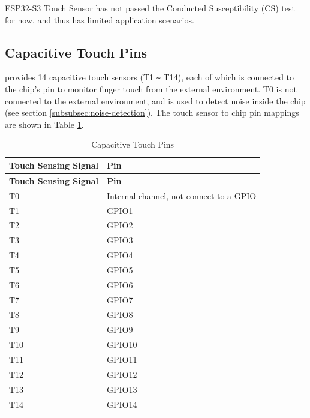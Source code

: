 \documentclass[main\_\_EN.tex]{subfiles}
\begin{document}
\begin{tiplisting}
ESP32-S3 Touch Sensor has not passed the Conducted Susceptibility (CS) test for now, and thus has limited application scenarios. 
\end{tiplisting}
\vspace{-1em}

\subsection{Capacitive Touch Pins}

\chipname{} provides 14 capacitive touch sensors (T1 \verb+~+ T14), each of which is connected to the chip's pin to monitor finger touch from the external environment. T0 is not connected to the external environment, and is used to detect noise inside the chip (see section \ref{subsubsec:noise-detection}). The touch sensor to chip pin mappings are shown in Table \ref{table:touch pads}.
\begin{longtable}[c]{|p{4.0cm}|p{6.0cm}| }
    \caption{\chipname{} Capacitive Touch Pins}
    \label{table:touch pads}
    \\\hline
    \rowcolor{lightgray}
    \textbf{Touch Sensing Signal} & \textbf{Pin} \\
    \hline
    \endfirsthead
    \hline
    \rowcolor{lightgray}
    \textbf{Touch Sensing Signal} & \textbf{Pin} \\
    \hline
    \endhead
    \endfoot
    \endlastfoot
    T0  & Internal channel, not connect to a GPIO \\\hline
    T1  &  GPIO1 \\\hline
    T2  &  GPIO2 \\\hline
    T3  &  GPIO3  \\\hline
    T4  &  GPIO4  \\\hline
    T5  &  GPIO5  \\\hline
    T6  &  GPIO6  \\\hline
    T7  &  GPIO7 \\\hline
    T8  &  GPIO8 \\\hline
    T9  &  GPIO9 \\\hline
    T10 &  GPIO10 \\\hline
    T11 &  GPIO11 \\\hline
    T12 &  GPIO12 \\\hline
    T13 &  GPIO13 \\\hline
    T14 &  GPIO14 \\\hline
\end{longtable}
\end{document}
